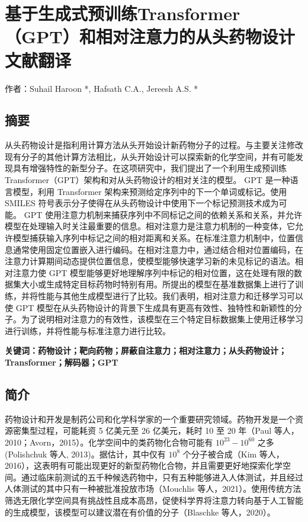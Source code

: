 \chapter{基于生成式预训练Transformer（GPT）和相对注意力的从头药物设计\quad 文献翻译}

\begin{center}
  作者：Suhail Haroon *, Hafsath C.A., Jereesh A.S. *
\end{center}

\section*{摘要}
\begin{center}
  
  从头药物设计是指利用计算方法从头开始设计新药物分子的过程。与主要关注修改现有分子的其他计算方法相比，从头开始设计可以探索新的化学空间，并有可能发现具有增强特性的新型分子。在这项研究中，我们提出了一个利用生成预训练Transformer（GPT）架构和对从头药物设计的相对关注的模型。 GPT 是一种语言模型，利用 Transformer 架构来预测给定序列中的下一个单词或标记。使用 SMILES 符号表示分子使得在从头药物设计中使用下一个标记预测技术成为可能。 GPT 使用注意力机制来捕获序列中不同标记之间的依赖关系和关系，并允许模型在处理输入时关注最重要的信息。相对注意力是注意力机制的一种变体，它允许模型捕获输入序列中标记之间的相对距离和关系。在标准注意力机制中，位置信息通常使用固定位置嵌入进行编码。在相对注意力中，通过结合相对位置编码，在注意力计算期间动态提供位置信息，使模型能够快速学习新的未见标记的语法。相对注意力使 GPT 模型能够更好地理解序列中标记的相对位置，这在处理有限的数据集大小或生成特定目标药物时特别有用。所提出的模型在基准数据集上进行了训练，并将性能与其他生成模型进行了比较。我们表明，相对注意力和迁移学习可以使 GPT 模型在从头药物设计的背景下生成具有更高有效性、独特性和新颖性的分子。为了说明相对注意力的有效性，该模型在三个特定目标数据集上使用迁移学习进行训练，并将性能与标准注意力进行比较。

\end{center}
\textbf{关键词：药物设计；靶向药物；屏蔽自注意力；相对注意力；从头药物设计；Transformer；解码器；GPT}

\section{简介}

药物设计和开发是制药公司和化学科学家的一个重要研究领域。药物开发是一个资源密集型过程，可能耗资 5 亿美元至 26 亿美元，耗时 10 至 20 年（Paul 等人，2010；Avorn，2015）。化学空间中的类药物化合物可能有 $10^{23}-10^{60}$ 之多 (Polishchuk 等人, 2013)。据估计，其中仅有 $10^8$ 个分子被合成（Kim 等人，2016），这表明有可能出现更好的新型药物化合物，并且需要更好地探索化学空间。通过临床前测试的五千种候选药物中，只有五种能够进入人体测试，并且经过人体测试的其中只有一种被批准投放市场（Mouchlis 等人，2021）。使用传统方法筛选无限化学空间具有挑战性且成本高昂，促使科学界将注意力转向基于人工智能的生成模型，该模型可以建议潜在有价值的分子（Blaschke 等人，2020）。

